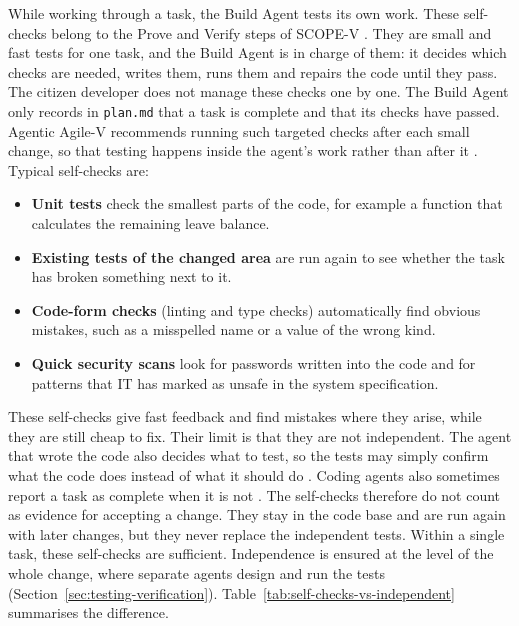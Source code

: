 \documentclass[10pt,a4paper]{article}
\begin{document}
\label{sec:build-self-checks}
While working through a task, the Build Agent tests its own work. These
self-checks belong to the Prove and Verify steps of SCOPE-V
\parencite{koch2026agentic}. They are small and fast tests for one task, and
the Build Agent is in charge of them: it decides which checks are needed,
writes them, runs them and repairs the code until they pass. The citizen
developer does not manage these checks one by one. The Build Agent only
records in \texttt{plan.md} that a task is complete and that its checks have
passed. Agentic Agile-V recommends running such targeted checks after each
small change, so that testing happens inside the agent's work rather than
after it \parencite{koch2026agentic}. Typical self-checks are:

\begin{itemize}
    \item \textbf{Unit tests} check the smallest parts of the code, for
    example a function that calculates the remaining leave balance.
    \item \textbf{Existing tests of the changed area} are run again to see
    whether the task has broken something next to it.
    \item \textbf{Code-form checks} (linting and type checks) automatically
    find obvious mistakes, such as a misspelled name or a value of the wrong
    kind.
    \item \textbf{Quick security scans} look for passwords written into the
    code and for patterns that IT has marked as unsafe in the system
    specification.
\end{itemize}

These self-checks give fast feedback and find mistakes where they arise,
while they are still cheap to fix. Their limit is that they are not
independent. The agent that wrote the code also decides what to test, so the
tests may simply confirm what the code does instead of what it should do
\parencite{koch2026agile}. Coding agents also sometimes report a task as
complete when it is not \parencite{alhasan2026,uddin2026}. The self-checks
therefore do not count as evidence for accepting a change. They stay in the
code base and are run again with later changes, but they never replace the
independent tests. Within a single task, these self-checks are sufficient.
Independence is ensured at the level of the whole change, where separate
agents design and run the tests (Section~\ref{sec:testing-verification}).
Table~\ref{tab:self-checks-vs-independent} summarises the difference.
\end{document}
